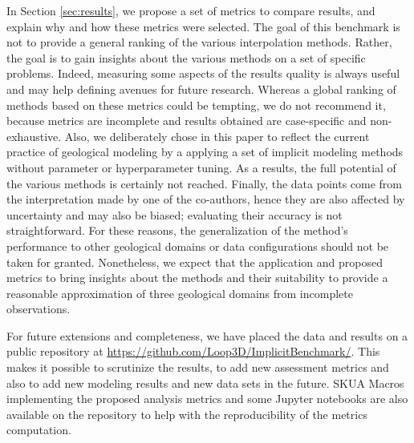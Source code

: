 \documentclass[preprint]{ring20}
\begin{document}
In Section \ref{sec:results}, we propose a set of metrics to compare results, and explain why and how these metrics were selected. The goal of this benchmark is not to provide a general ranking of the various interpolation methods. Rather, the goal is to gain insights about the various methods on a set of specific problems. Indeed, measuring some aspects of the results quality is always useful and may help defining avenues for future research. Whereas a global ranking of methods based on these metrics could be tempting, we do not recommend it, because metrics are incomplete and results obtained are case-specific and non-exhaustive. Also, we deliberately chose in this paper to reflect the current practice of geological modeling by a applying a set of implicit modeling methods without parameter or hyperparameter tuning. As a results, the full potential of the various methods is certainly not reached. Finally, the data points come from the interpretation made by one of the co-authors, hence they are also affected by uncertainty and may also be biased; evaluating their accuracy is not straightforward. For these reasons, the generalization of the method's performance to other geological domains or data configurations should not be taken for granted. Nonetheless, we expect that the application and proposed metrics to bring insights about the methods and their suitability to provide a reasonable approximation of three geological domains from incomplete observations. 

For future extensions and completeness, we have placed the data and results on a public repository at \url{https://github.com/Loop3D/ImplicitBenchmark/}. This makes it possible to scrutinize the results, to add new assessment metrics and also to add new modeling results and new data sets in the future. SKUA Macros implementing the proposed analysis metrics and some Jupyter notebooks are also available on the repository to help with the reproducibility of the metrics computation. 

\end{document}

